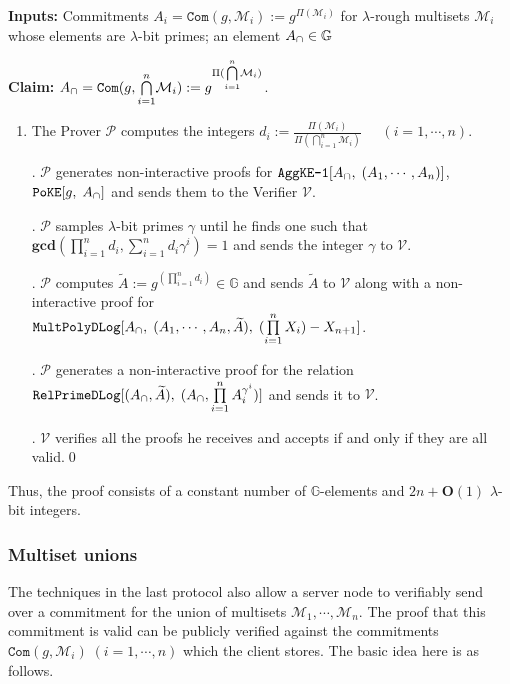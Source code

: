 \documentclass[11pt, lettersize, notitlepage, leqno, footskip=0.6cm]{article}
\newcommand{\pl}{\prod\limits}
\newcommand{\slim}{\sum\limits}
\newcommand{\ttt}{\texttt}
\newcommand{\bG}{\mathbb{G}}
\newcommand{\pr}{\protect}
\newcommand{\wti}{\widetilde}
\newcommand{\mc}{\mathcal}
\newcommand{\mb}{\mathbb}
\newcommand{\mbf}{\mathbf}
\newcommand{\lam}{\lambda}
\newcommand{\bO}{\mbf{O}}
\newcommand{\mP}{\mc{P}}
\newcommand{\V}{\mc{V}}
\newcommand{\mcM}{\mc{M}}
\newcommand{\vs}{\vspace{-0.15cm}}
\newcommand{\noin}{\noindent}
\newcommand{\GCD}{\mbf{gcd}}
\numberwithin{equation}{section}
\begin{document}
\noin \textbf{Inputs:} Commitments $A_i = \ttt{Com}(g, \mcM_i) := g^{\Pi(\mc{M}_i)}$ for $\lam$-rough multisets $\mc{M}_i$ whose elements are $\lam$-bit primes; an element $A_{\tt{\cap}}\in\mb{G}$

\noin \textbf{Claim:} $A_{\tt{\cap}} = \protect{\verb|Com|}(g, {\bigcap\limits_{i=1}^n} \mc{M}_i) := g^{\Pi({\bigcap\limits_{i=1}^n} \mc{M}_i)}$.

\begin{enumerate}[wide, labelwidth=!, labelindent=0pt]\vs \item The Prover $\mP$ computes the integers $d_i:= \frac{\Pi(\mc{M}_i)}{\Pi({\bigcap\limits_{i=1}^n} \mc{M}_i)}\;\;\;\;\; (i=1,\cdots,n).$

\noin 2. $\mP$ generates non-interactive proofs for $\pr{\ttt{AggKE-1}}[A_{\tt{\cap}},\;(A_1,\cdots,A_n)]$, $\ttt{PoKE}[g,\;A_{\tt{\cap}}]$ and sends them to the Verifier $\V$.

\noin 3. $\mP$ samples $\lam$-bit primes $\gamma$ until he finds one such that $ \GCD(\pl_{i=1}^n d_i, \slim_{i=1}^n d_i\gamma^i) = 1$ and sends the integer $\gamma$ to $\V$.

\noin 4. $\mP$ computes $\wti{A}:= g^{(\prod_{i=1}^n d_i)}\in\bG$ and sends $\wti{A}$ to $\V$ along with a non-interactive proof for\\ $\ttt{MultPolyDLog}[A_{\tt{\cap}},\; (A_1,\cdots,A_n, \wti{A}),\;(\pl_{i=1}^n X_i)-X_{n+1}]$.\vs

\noin 5. $\mP$ generates a non-interactive proof for the relation $\ttt{RelPrimeDLog}[(A_{\tt{\cap}}, \wti{A}),\;(A_{\tt{\cap}}, \pl_{i=1}^n A_i^{\gamma^i})]$ and sends it to $\V$.

\noin 6. $\V$ verifies all the proofs he receives and accepts if and only if they are all valid.\qed \end{enumerate}


\noin Thus, the proof consists of a constant number of $\bG$-elements and $2n+\bO(1)$ $\lam$-bit integers. 
 




\subsubsection{\fontsize{11}{11}\selectfont Multiset unions }

\noin The techniques in the last protocol also allow a server node to verifiably send over a commitment for the union of multisets $\mcM_1,\cdots,\mcM_n$. The proof that this commitment is valid can be publicly verified against the commitments $\ttt{Com}(g,\mc{M}_i)\;(i=1,\cdots,n)$ which the client stores. The basic idea here is as follows.
\end{document}
